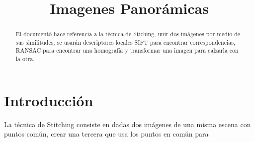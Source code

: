 \documentclass[conference]{IEEEtran}
\begin{document}
\title{Imagenes Panorámicas}
\author{
}


\maketitle

\begin{abstract}
	El documentó hace referencia a la técnica de Stiching, unir dos imágenes por medio de sus similitudes, se usarán descriptores locales SIFT para encontrar correspondencias, RANSAC para encontrar una homografía y transformar una imagen para calzarla con la otra.
\end{abstract}
 

\section*{Introducción} %
	La técnica de Stitching consiste en dadas dos imágenes de una misma escena con puntos común, crear una tercera que usa los puntos en común para 
\end{document}
